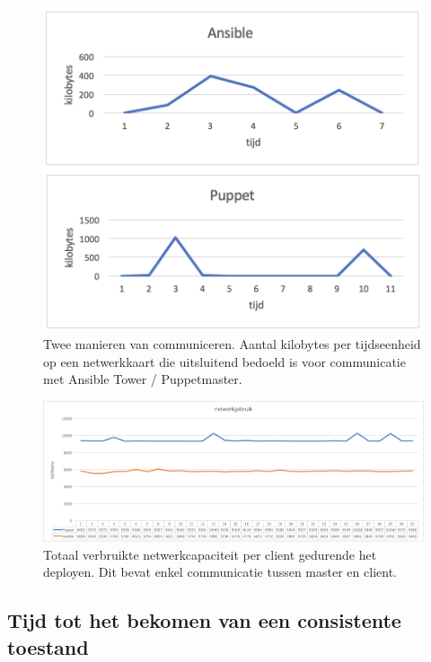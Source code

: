 \begin{figure}
	\includegraphics[width=430px]{img/deploytypes.png}
	\caption{Twee manieren van communiceren. Aantal kilobytes per tijdseenheid op een netwerkkaart die uitsluitend bedoeld is voor communicatie met Ansible Tower / Puppetmaster. }  
	\label{fig:deploytypes}
\end{figure}

\begin{figure}
	\includegraphics[width=\linewidth]{img/netwerkverbruik.png}
	\caption{Totaal verbruikte netwerkcapaciteit per client gedurende het deployen. Dit bevat enkel communicatie tussen master en client.}  
	\label{fig:netwerkverbruik}
\end{figure}



 
\subsection{Tijd tot het bekomen van een consistente toestand}


